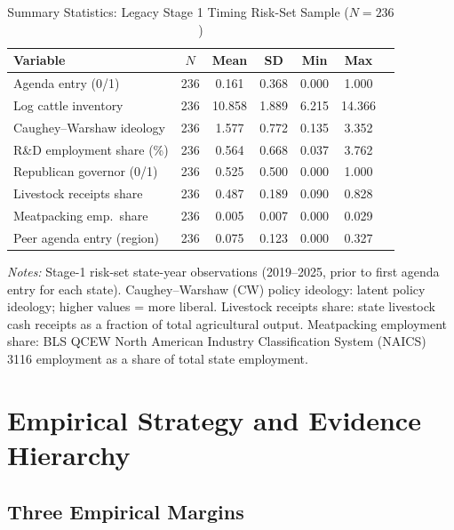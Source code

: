 \documentclass[12pt]{article}
\begin{document}
\begin{table}[htbp]
\centering
\begin{threeparttable}
\caption{Summary Statistics: Legacy Stage 1 Timing Risk-Set Sample ($N = 236$)}
\label{tab:sumstats}
\small
\begin{tabular}{lcccccc}
\toprule
Variable & $N$ & Mean & SD & Min & Max \\
\midrule
Agenda entry (0/1)            & 236 & 0.161 & 0.368 & 0.000 & 1.000 \\
Log cattle inventory          & 236 & 10.858 & 1.889 & 6.215 & 14.366 \\
Caughey--Warshaw ideology     & 236 & 1.577 & 0.772 & 0.135 & 3.352 \\
R\&D employment share (\%)   & 236 & 0.564 & 0.668 & 0.037 & 3.762 \\
Republican governor (0/1)     & 236 & 0.525 & 0.500 & 0.000 & 1.000 \\
Livestock receipts share      & 236 & 0.487 & 0.189 & 0.090 & 0.828 \\
Meatpacking emp.\ share       & 236 & 0.005 & 0.007 & 0.000 & 0.029 \\
Peer agenda entry (region)    & 236 & 0.075 & 0.123 & 0.000 & 0.327 \\
\bottomrule
\end{tabular}
\begin{tablenotes}[flushleft]
\footnotesize
\item \textit{Notes:} Stage-1 risk-set state-year observations (2019--2025, prior to first agenda entry for each state).  Caughey--Warshaw (CW) policy ideology: latent policy ideology; higher values = more liberal.  Livestock receipts share: state livestock cash receipts as a fraction of total agricultural output.  Meatpacking employment share: BLS QCEW North American Industry Classification System (NAICS) 3116 employment as a share of total state employment.
\end{tablenotes}
\end{threeparttable}
\end{table}

\section{Empirical Strategy and Evidence Hierarchy}
\label{sec:empirical}

\subsection{Three Empirical Margins}
\end{document}
